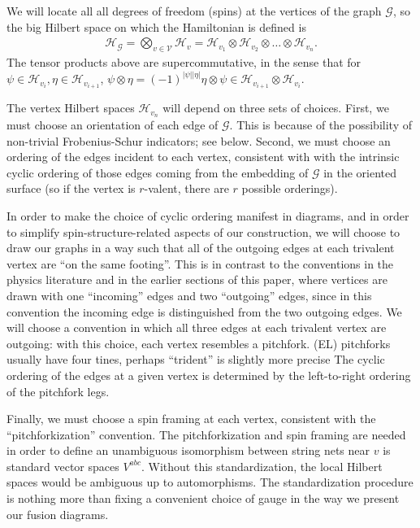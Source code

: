 \documentclass[12pt,a4paper]{article}
\newcommand{\tp}{\otimes}
\newcommand{\mcg}{\mathcal{G}}
\newcommand{\mch}{\mathcal{H}}
\newcommand{\mcv}{\mathcal{V}}
\newcommand{\ethan}[1]{{\color{amethyst}\footnotesize{(EL) #1}}}
\begin{document}
We will locate all all degrees of freedom (spins) at the vertices of the graph $\mcg$, so
the big Hilbert space on which the Hamiltonian is defined is
\begin{align}	\label{GraphHilbertSpace}
 \mch_\mcg =\bigotimes_{v \in \mcv} \mch_v  = \mch_{v_1} \tp \mch_{v_{2}} \tp \dots \tp \mch_{v_n} .
\end{align}
The tensor products above are supercommutative, in the sense that for $\psi\in \mch_{v_i},\eta\in \mch_{v_{i+1}}$, $\psi \tp \eta = (-1)^{|\psi||\eta|}\eta\tp\psi \in \mch_{v_{i+1}} \tp \mch_{v_i}$. 

The vertex Hilbert spaces $\mch_{v_n}$ will depend on three sets of choices.
First, we must choose an orientation of each edge of $\mcg$.
This is because of the possibility of non-trivial Frobenius-Schur indicators; see below.
Second, we must choose an ordering of the edges incident to each vertex, consistent with with the intrinsic cyclic ordering of those edges
coming from the embedding of $\mcg$ in the oriented surface
(so if the vertex is $r$-valent, there are $r$ possible orderings).

In order to make the choice of cyclic ordering manifest in diagrams, and in order to simplify spin-structure-related
aspects of our construction, we will choose to draw our graphs in a way such that all of the outgoing 
edges at each trivalent vertex are ``on the same footing''. This is in contrast to the conventions in the physics literature
and in the earlier sections of this paper, where vertices are drawn with one ``incoming'' edges and two 
``outgoing'' edges, since in this convention the incoming edge is distinguished from the two outgoing edges.
We will choose a convention in which all three edges at each trivalent vertex are outgoing: with this
choice, each vertex resembles a pitchfork. \ethan{pitchforks usually have four tines, perhaps ``trident'' is slightly more precise}
The cyclic ordering of the edges at a given vertex is determined by the left-to-right ordering of the pitchfork legs. 

Finally, we must choose a spin framing at each vertex, consistent with the ``pitchforkization'' convention.
The pitchforkization and spin framing are needed in order to define an unambiguous
isomorphism between string nets near $v$ is standard vector spaces $V^{abc}$.
Without this standardization, the local Hilbert spaces would be ambiguous up to automorphisms. 
The standardization procedure is nothing more than fixing a convenient choice of gauge in the way we present our fusion diagrams. 
\end{document}
